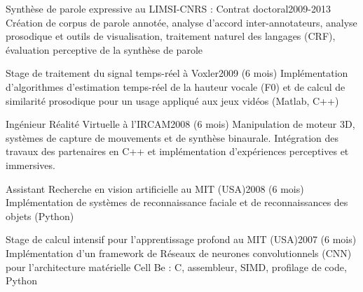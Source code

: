 \begin{fr}
\begin{jobshort}{Synthèse de parole expressive au LIMSI-CNRS : Contrat doctoral}{2009-2013}
Création de corpus de parole annotée, analyse d'accord inter-annotateurs, analyse prosodique et outils de visualisation, traitement naturel des langages (CRF), évaluation perceptive de la synthèse de parole
\end{jobshort}



\begin{jobshort}{Stage de traitement du signal temps-réel à Voxler}{2009 (6 mois)}
Implémentation d'algorithmes d'estimation temps-réel de la hauteur vocale (F0) et de calcul de similarité prosodique pour un usage appliqué aux jeux vidéos (Matlab, C++)
\end{jobshort}

\begin{jobshort}{Ingénieur Réalité Virtuelle à l'IRCAM}{2008 (6 mois)}
Manipulation de moteur 3D, systèmes de capture de mouvements et de synthèse binaurale. Intégration des travaux des partenaires en C++ et implémentation d'expériences perceptives et immersives.
\end{jobshort}

\begin{jobshort}{Assistant Recherche en vision artificielle au MIT (USA)}{2008 (6 mois)}
Implémentation de systèmes de reconnaissance faciale et de reconnaissances des objets (Python)
\end{jobshort}

\begin{jobshort}{Stage de calcul intensif pour l'apprentissage profond au MIT (USA)}{2007 (6 mois)}
Implémentation d'un framework de Réseaux de neurones convolutionnels (CNN) pour l'architecture matérielle Cell Be : C, assembleur, SIMD, profilage de code, Python
\end{jobshort}
\end{fr}



